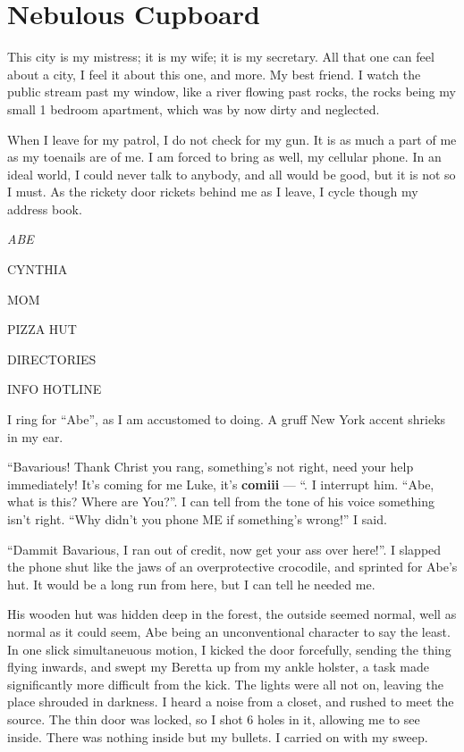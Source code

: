 \chapter{Nebulous Cupboard}





This city is my mistress; it is my wife; it is my secretary. All
that one can feel about a city, I feel it about this one, and more.
My best friend. I watch the public stream past my window, like a
river flowing past rocks, the rocks being my small 1 bedroom
apartment, which was by now dirty and neglected.



When I leave for my patrol, I do not check for my gun. It is as
much a part of me as my toenails are of me. I am forced to bring as
well, my cellular phone. In an ideal world, I could never talk to
anybody, and all would be good, but it is not so I must. As the
rickety door rickets behind me as I leave, I cycle though my
address book.



{\em ABE



CYNTHIA



MOM



PIZZA HUT



DIRECTORIES



INFO HOTLINE}



I ring for ``Abe'', as I am accustomed to doing. A gruff
New York accent shrieks in my ear.



``Bavarious! Thank Christ you rang, something's not
right, need your help immediately! It's coming for me Luke,
it's {\bf comiii} --- ``. I interrupt him. ``Abe,
what is this? Where are You?''. I can tell from the tone of
his voice something isn't right. ``Why didn't you
phone ME if something's wrong!'' I said.



``Dammit Bavarious, I ran out of credit, now get your ass over
here!''. I slapped the phone shut like the jaws of an
overprotective crocodile, and sprinted for Abe's hut. It
would be a long run from here, but I can tell he needed me.



His wooden hut was hidden deep in the forest, the outside seemed
normal, well as normal as it could seem, Abe being an
unconventional character to say the least. In one slick
simultaneuous motion, I kicked the door forcefully, sending the
thing flying inwards, and swept my Beretta up from my ankle
holster, a task made significantly more difficult from the kick.
The lights were all not on, leaving the place shrouded in darkness.
I heard a noise from a closet, and rushed to meet the source. The
thin door was locked, so I shot 6 holes in it, allowing me to see
inside. There was nothing inside but my bullets. I carried on with
my sweep.



